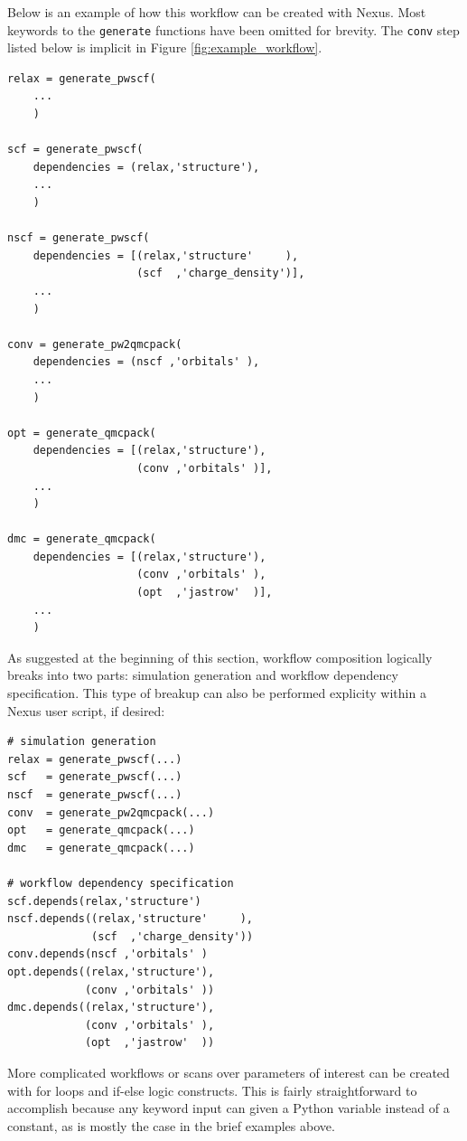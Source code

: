\documentclass[oneside,11pt]{memoir}
\numberwithin{equation}{section}
\begin{document}
Below is an example of how this workflow can be created with Nexus.  Most keywords to the \texttt{generate} functions have been omitted for brevity.  The \texttt{conv} step listed below is implicit in Figure \ref{fig:example_workflow}.
\begin{verbatim}
relax = generate_pwscf(
    ...
    )

scf = generate_pwscf(
    dependencies = (relax,'structure'),
    ...
    )

nscf = generate_pwscf(
    dependencies = [(relax,'structure'     ),
                    (scf  ,'charge_density')],
    ...
    )

conv = generate_pw2qmcpack(
    dependencies = (nscf ,'orbitals' ),
    ...
    )

opt = generate_qmcpack(
    dependencies = [(relax,'structure'),
                    (conv ,'orbitals' )],
    ...
    )

dmc = generate_qmcpack(
    dependencies = [(relax,'structure'),
                    (conv ,'orbitals' ),
                    (opt  ,'jastrow'  )],
    ...
    )
\end{verbatim}

\noindent
As suggested at the beginning of this section, workflow composition logically breaks into two parts: simulation generation and workflow dependency specification.  This type of breakup can also be performed explicity within a Nexus user script, if desired:
\begin{verbatim}
# simulation generation
relax = generate_pwscf(...)
scf   = generate_pwscf(...)
nscf  = generate_pwscf(...)
conv  = generate_pw2qmcpack(...)
opt   = generate_qmcpack(...)
dmc   = generate_qmcpack(...)

# workflow dependency specification
scf.depends(relax,'structure')
nscf.depends((relax,'structure'     ),
             (scf  ,'charge_density'))
conv.depends(nscf ,'orbitals' )
opt.depends((relax,'structure'),
            (conv ,'orbitals' ))
dmc.depends((relax,'structure'),
            (conv ,'orbitals' ),
            (opt  ,'jastrow'  ))
\end{verbatim}

\noindent
More complicated workflows or scans over parameters of interest can be created with for loops and if-else logic constructs.  This is fairly straightforward to accomplish because any keyword input can given a Python variable instead of a constant, as is mostly the case in the brief examples above.
\end{document}

